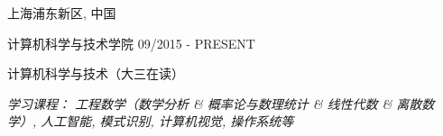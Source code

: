 \vspace{-6.0mm}

\begin{cventries}
\vspace{-1.5mm}
\cveducation
{}
{上海浦东新区, 中国}

\cvsubeducation
{计算机科学与技术学院}
{09/2015 - PRESENT}
{
    \begin{cvitems}
    \item {计算机科学与技术（大三在读）}
    \item {\itshape{学习课程： 工程数学（数学分析 \& 概率论与数理统计 \& 线性代数 \& 离散数学）, 人工智能, 模式识别, 计算机视觉, 操作系统等}}
    \end{cvitems}
}
\vspace{-1.0mm}

\end{cventries}
